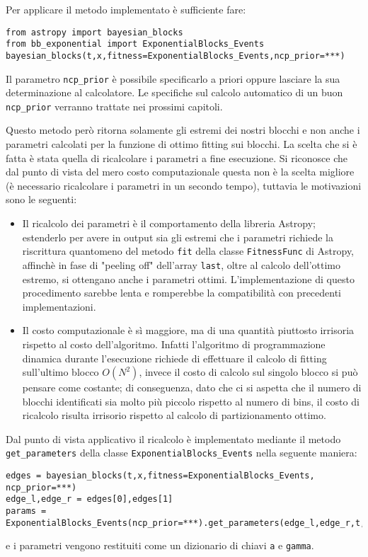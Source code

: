 \documentclass[10pt,a4paper]{report}
\begin{document}
Per applicare il metodo implementato è sufficiente fare:
\begin{verbatim}
from astropy import bayesian_blocks
from bb_exponential import ExponentialBlocks_Events
bayesian_blocks(t,x,fitness=ExponentialBlocks_Events,ncp_prior=***)
\end{verbatim}
Il parametro \texttt{ncp\_prior} è possibile specificarlo a priori oppure lasciare la sua determinazione al calcolatore. Le specifiche sul calcolo automatico di un buon \texttt{ncp\_prior} verranno trattate nei prossimi capitoli.

Questo metodo però ritorna solamente gli estremi dei nostri blocchi e non anche i parametri calcolati per la funzione di ottimo fitting sui blocchi.
La scelta che si è fatta è stata quella di ricalcolare i parametri a fine esecuzione. Si riconosce che dal punto di vista del mero costo computazionale questa non è la scelta migliore (è necessario ricalcolare i parametri in un secondo tempo), tuttavia le motivazioni sono le seguenti:
\begin{itemize}
\item Il ricalcolo dei parametri è il comportamento della libreria Astropy; estenderlo per avere in output sia gli estremi che i parametri richiede la riscrittura quantomeno del metodo \texttt{fit} della classe \texttt{FitnessFunc} di Astropy, affinchè in fase di "peeling off" dell'array \texttt{last}, oltre al calcolo dell'ottimo estremo, si ottengano anche i parametri ottimi. L'implementazione di questo procedimento sarebbe lenta e romperebbe la compatibilità con precedenti implementazioni.
\item Il costo computazionale è sì maggiore, ma di una quantità piuttosto irrisoria rispetto al costo dell'algoritmo. Infatti l'algoritmo di programmazione dinamica durante l'esecuzione richiede di effettuare il calcolo di fitting sull'ultimo blocco $O(N^2)$, invece il costo di calcolo sul singolo blocco si può pensare come costante; di conseguenza, dato che ci si aspetta che il numero di blocchi identificati sia molto più piccolo rispetto al numero di bins, il costo di ricalcolo risulta irrisorio rispetto al calcolo di partizionamento ottimo.
\end{itemize}
Dal punto di vista applicativo il ricalcolo è implementato mediante il metodo \texttt{get\_parameters} della classe \texttt{ExponentialBlocks\_Events} nella seguente maniera:
\begin{verbatim}
edges = bayesian_blocks(t,x,fitness=ExponentialBlocks_Events, ncp_prior=***)
edge_l,edge_r = edges[0],edges[1]
params = ExponentialBlocks_Events(ncp_prior=***).get_parameters(edge_l,edge_r,t,x)
\end{verbatim}
e i parametri vengono restituiti come un dizionario di chiavi \texttt{a} e \texttt{gamma}.
\end{document}
